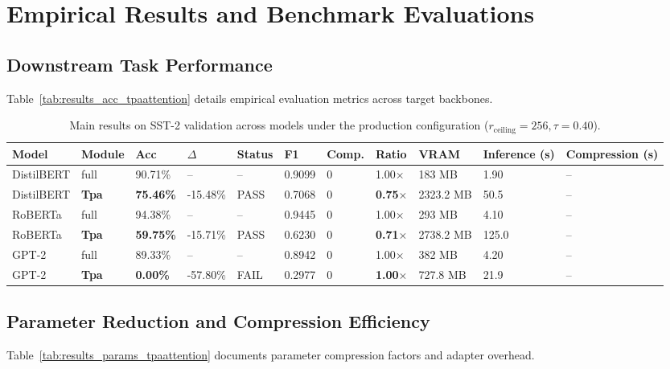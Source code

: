 \section{Empirical Results and Benchmark Evaluations}

\subsection{Downstream Task Performance}
Table~\ref{tab:results_acc_tpaattention} details empirical evaluation metrics across target backbones.

\begin{table}[t]
\centering
\small
\begin{tabular}{lllllllllll}
\toprule
\textbf{Model} & \textbf{Module} & \textbf{Acc} & \textbf{$\Delta$} & \textbf{Status} & \textbf{F1} & \textbf{Comp.} & \textbf{Ratio} & \textbf{VRAM} & \textbf{Inference (s)} & \textbf{Compression (s)} \\
\midrule
DistilBERT & full & 90.71\% & -- & -- & 0.9099 & 0 & 1.00$\times$ & 183 MB & 1.90 & -- \\
DistilBERT & \textbf{Tpa} & \textbf{75.46\%} & -15.48\% & PASS & 0.7068 & 0 & \textbf{0.75$\times$} & 2323.2 MB & 50.5 & -- \\
RoBERTa & full & 94.38\% & -- & -- & 0.9445 & 0 & 1.00$\times$ & 293 MB & 4.10 & -- \\
RoBERTa & \textbf{Tpa} & \textbf{59.75\%} & -15.71\% & PASS & 0.6230 & 0 & \textbf{0.71$\times$} & 2738.2 MB & 125.0 & -- \\
GPT-2 & full & 89.33\% & -- & -- & 0.8942 & 0 & 1.00$\times$ & 382 MB & 4.20 & -- \\
GPT-2 & \textbf{Tpa} & \textbf{0.00\%} & -57.80\% & FAIL & 0.2977 & 0 & \textbf{1.00$\times$} & 727.8 MB & 21.9 & -- \\
\bottomrule
\end{tabular}
\caption{Main results on SST-2 validation across models under the production configuration ($r_{\mathrm{ceiling}}=256, \tau=0.40$).}
\label{tab:main_sst2}
\end{table}

\subsection{Parameter Reduction and Compression Efficiency}
Table~\ref{tab:results_params_tpaattention} documents parameter compression factors and adapter overhead.

